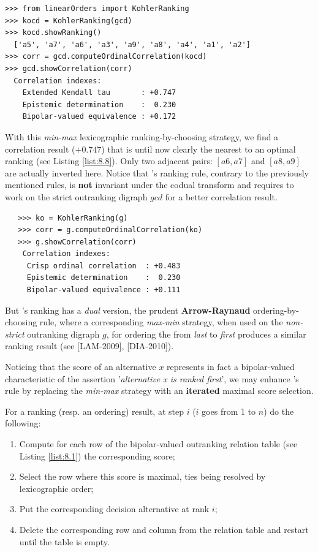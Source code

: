 \begin{lstlisting}[caption={Computing a \Kohler ranking},label=list:8.13]   
>>> from linearOrders import KohlerRanking
>>> kocd = KohlerRanking(gcd)
>>> kocd.showRanking()
  ['a5', 'a7', 'a6', 'a3', 'a9', 'a8', 'a4', 'a1', 'a2']
>>> corr = gcd.computeOrdinalCorrelation(kocd)
>>> gcd.showCorrelation(corr)
  Correlation indexes:
    Extended Kendall tau       : +0.747
    Epistemic determination    :  0.230
    Bipolar-valued equivalence : +0.172
\end{lstlisting}

With this \emph{min-max} lexicographic ranking-by-choosing strategy, we find a correlation result ($+0.747$) that is until now clearly the nearest to an optimal \Kemeny ranking (see Listing \ref{list:8.8}). Only two adjacent pairs: $[a6, a7]$ and $[a8, a9]$ are actually inverted here. Notice that \Kohler 's ranking rule, contrary to the previously mentioned rules, is \textbf{not} invariant under the codual transform and requires to work on the strict outranking digraph $gcd$ for a better correlation result.

\begin{lstlisting}
   >>> ko = KohlerRanking(g)  
   >>> corr = g.computeOrdinalCorrelation(ko)
   >>> g.showCorrelation(corr)
    Correlation indexes:
     Crisp ordinal correlation  : +0.483
     Epistemic determination    :  0.230
     Bipolar-valued equivalence : +0.111
\end{lstlisting}

But \Kohler 's ranking has a \emph{dual} version, the prudent \textbf{Arrow-Raynaud} ordering-by-choosing rule, where a corresponding \emph{max-min} strategy, when used on the \emph{non-strict} outranking digraph $g$, for ordering the from \emph{last} to \emph{first} produces a similar ranking result (see [LAM-2009], [DIA-2010]).

Noticing that the \NetFlows score of an alternative $x$ represents in fact a bipolar-valued characteristic of the assertion '\emph{alternative x is ranked first}', we may enhance \Kohler 's rule by replacing the \emph{min-max} strategy with an \textbf{iterated} maximal \NetFlows score selection.

For a ranking (resp. an ordering) result, at step $i$ ($i$ goes from 1 to $n$) do the following:
\begin{enumerate}
\item Compute for each row of the bipolar-valued outranking relation table (see Listing \ref{list:8.1}) the corresponding \NetFlows score;
\item Select the row where this score is maximal, ties being resolved by lexicographic order;
\item Put the corresponding decision alternative at rank $i$;
\item Delete the corresponding row and column from the relation table and restart until the table is empty.
\end{enumerate}

